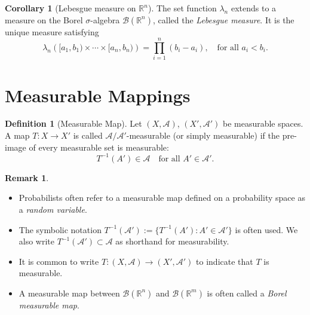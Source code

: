 \documentclass[12pt]{article}
\theoremstyle{definition}
\newtheorem{definition}{Definition}[section]
\newtheorem{corollary}{Corollary}[theorem]
\newtheorem{remark}{Remark}[section]
\begin{document}
\medskip
\begin{corollary}[Lebesgue measure on \( \mathbb{R}^n \)]
The set function \( \lambda_n \) extends to a measure on the Borel \( \sigma \)-algebra \( \mathcal{B}(\mathbb{R}^n) \), called the \emph{Lebesgue measure}. It is the unique measure satisfying
\[
\lambda_n\left( [a_1, b_1) \times \cdots \times [a_n, b_n) \right) = \prod_{i=1}^n (b_i - a_i), \quad \text{for all } a_i < b_i.
\]
\end{corollary}



\vspace{3em}
\section{Measurable Mappings}

\medskip
\begin{definition}[Measurable Map]
Let \( (X, \mathcal{A}) \), \( (X', \mathcal{A}') \) be measurable spaces. A map \( T : X \to X' \) is called \(\mathcal{A}/\mathcal{A}'\)-measurable (or simply measurable) if the pre-image of every measurable set is measurable:
\[
T^{-1}(A') \in \mathcal{A} \quad \text{for all } A' \in \mathcal{A}'.
\]
\end{definition}

\begin{remark}
\leavevmode
\begin{itemize}
    \item Probabilists often refer to a measurable map defined on a probability space as a \emph{random variable}.
    \item The symbolic notation \( T^{-1}(\mathcal{A}') := \{ T^{-1}(A') : A' \in \mathcal{A}' \} \) is often used. We also write \( T^{-1}(\mathcal{A}') \subset \mathcal{A} \) as shorthand for measurability.
    \item It is common to write \( T : (X, \mathcal{A}) \to (X', \mathcal{A}') \) to indicate that \( T \) is measurable.
    \item A measurable map between \( \mathcal{B}(\mathbb{R}^n) \) and \( \mathcal{B}(\mathbb{R}^m) \) is often called a \emph{Borel measurable map}.
\end{itemize}
\end{remark}
\end{document}
